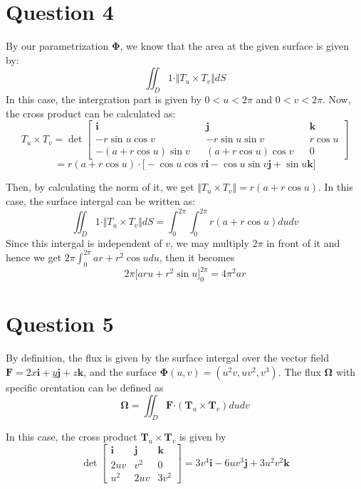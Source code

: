 \documentclass[12pt]{article}
\renewcommand{\vec}[1]{\boldsymbol{#1}}
\begin{document}
\section*{Question 4}
By our parametrization $\vec{\Phi}$, we know that the 
area at the given surface is given by:
\[ \iint_D 1 \cdot \Vert T_u  \times T_v \Vert dS \]
In this case, the intergration part is given by 
$ 0<u<2\pi$ and $0 < v < 2\pi$. Now, the cross
product can be calculated as:
\[ T_u \times T_v = \det
\begin{bmatrix}
\vec i && \vec j && \vec k \\
-r\sin u \cos v && -r \sin u \sin v && r\cos u \\
-(a+r\cos u) \sin v && (a+r\cos u) \cos v && 0
\end{bmatrix}
\]
\[ =  r(a+r\cos u) \cdot \Bigg[ -\cos u \cos v \vec i -
\cos u \sin v \vec j + \sin u \vec k \Bigg]\]

Then, by calculating the norm of it, we get
$ \Vert T_u \times T_v \Vert = r(a+r\cos u) $. In this case,
the surface intergal can be written as:
\[ \iint_D 1 \cdot \Vert T_u \times T_v \Vert dS = 
\int_0^{2\pi} \int_0^{2\pi} r(a+r\cos u) dudv\]
Since this intergal is independent of $v$, we may multiply
$2\pi$ in front of it and hence we get
$\displaystyle{2\pi \int_0^{2\pi} ar + r^2 \cos u du}$, then
it becomes 
\[ 2\pi \Bigg[ aru + r^2\sin u\Bigg]^{2\pi}_0 = 4\pi^2 ar\]




\newpage
\section*{Question 5}

By definition, the flux is given by the surface intergal 
over the vector field $\vec F = 2x \vec i + y \vec j +
z \vec k$, and the surface $ \vec{\Phi}(u,v) = 
(u^2v,uv^2,v^3)$. The flux $\vec{\Omega}$ 
with specific orentation can be defined 
as 
\[ \vec{\Omega} = \iint_D \vec{F} \vec{\cdot} 
(\vec{T}_u \times \vec{T}_v) dudv 
\]

In this case, the cross product $\vec{T}_u \times
\vec{T}_v $ is given by
\[ \det
\begin{bmatrix}
\vec i & \vec j & \vec k \\
2uv & v^2 & 0\\
u^2 & 2uv & 3v^2
\end{bmatrix} = 3v^4 \vec i - 6uv^3 \vec j + 3u^2v^2 \vec k
\]
\end{document}
